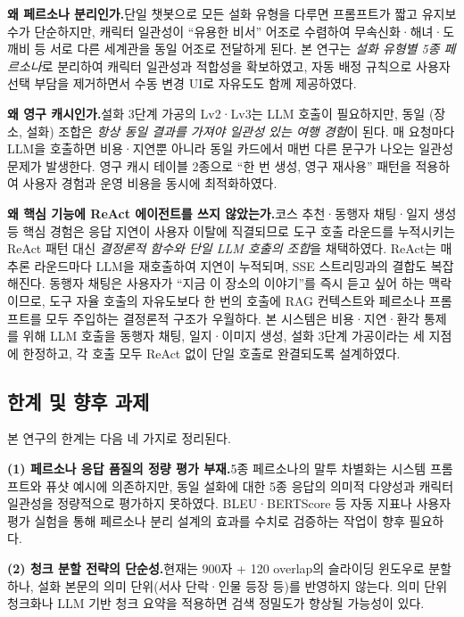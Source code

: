 \documentclass[10pt,twocolumn,a4paper]{article}
\begin{document}
\textbf{왜 페르소나 분리인가.}\quad 단일 챗봇으로 모든 설화 유형을 다루면
프롬프트가 짧고 유지보수가 단순하지만, 캐릭터 일관성이 ``유용한 비서''
어조로 수렴하여 무속신화·해녀·도깨비 등 서로 다른 세계관을 동일 어조로
전달하게 된다. 본 연구는 \emph{설화 유형별 5종 페르소나}로 분리하여 캐릭터
일관성과 적합성을 확보하였고, 자동 배정 규칙으로 사용자 선택 부담을 제거하면서
수동 변경 UI로 자유도도 함께 제공하였다.

\textbf{왜 영구 캐시인가.}\quad 설화 3단계 가공의 Lv2·Lv3는 LLM 호출이
필요하지만, 동일 (장소, 설화) 조합은 \emph{항상 동일 결과를 가져야 일관성
있는 여행 경험}이 된다. 매 요청마다 LLM을 호출하면 비용·지연뿐 아니라
동일 카드에서 매번 다른 문구가 나오는 일관성 문제가 발생한다. 영구 캐시
테이블 2종으로 ``한 번 생성, 영구 재사용'' 패턴을 적용하여 사용자 경험과
운영 비용을 동시에 최적화하였다.

\textbf{왜 핵심 기능에 ReAct 에이전트를 쓰지 않았는가.}\quad 코스 추천·동행자
채팅·일지 생성 등 핵심 경험은 응답 지연이 사용자 이탈에 직결되므로 도구
호출 라운드를 누적시키는 ReAct 패턴 대신 \emph{결정론적 함수와 단일 LLM
호출의 조합}을 채택하였다. ReAct는 매 추론 라운드마다 LLM을 재호출하여
지연이 누적되며, SSE 스트리밍과의 결합도 복잡해진다. 동행자 채팅은 사용자가
``지금 이 장소의 이야기''를 즉시 듣고 싶어 하는 맥락이므로, 도구 자율
호출의 자유도보다 한 번의 호출에 RAG 컨텍스트와 페르소나 프롬프트를 모두
주입하는 결정론적 구조가 우월하다. 본 시스템은 비용·지연·환각 통제를 위해
LLM 호출을 동행자 채팅, 일지·이미지 생성, 설화 3단계 가공이라는 세 지점에
한정하고, 각 호출 모두 ReAct 없이 단일 호출로 완결되도록 설계하였다.

\subsection{한계 및 향후 과제}

본 연구의 한계는 다음 네 가지로 정리된다.

\textbf{(1) 페르소나 응답 품질의 정량 평가 부재.}\quad 5종 페르소나의 말투
차별화는 시스템 프롬프트와 퓨샷 예시에 의존하지만, 동일 설화에 대한 5종
응답의 의미적 다양성과 캐릭터 일관성을 정량적으로 평가하지 못하였다.
BLEU·BERTScore 등 자동 지표나 사용자 평가 실험을 통해 페르소나 분리 설계의
효과를 수치로 검증하는 작업이 향후 필요하다.

\textbf{(2) 청크 분할 전략의 단순성.}\quad 현재는 900자 + 120 overlap의
슬라이딩 윈도우로 분할하나, 설화 본문의 의미 단위(서사 단락·인물 등장 등)를
반영하지 않는다. 의미 단위 청크화나 LLM 기반 청크 요약을 적용하면 검색
정밀도가 향상될 가능성이 있다.
\end{document}
